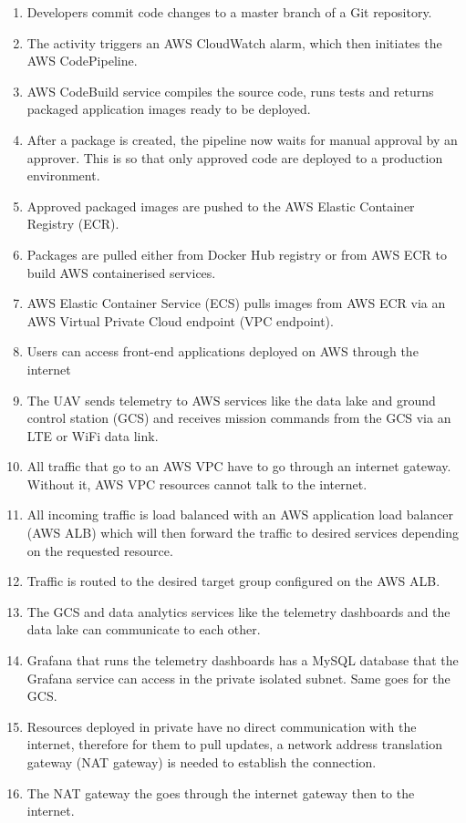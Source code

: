 \begin{enumerate}
    \item Developers commit code changes to a master branch of a Git repository.
    \item The activity triggers an AWS CloudWatch alarm, which then initiates the AWS CodePipeline.
    \item AWS CodeBuild service compiles the source code, runs tests and returns packaged application images ready to be deployed.
    \item After a package is created, the pipeline now waits for manual approval by an approver. This is so that only approved code are deployed to a production environment.
    \item Approved packaged images are pushed to the AWS Elastic Container Registry (ECR).
    \item Packages are pulled either from Docker Hub registry or from AWS ECR to build AWS containerised services.
    \item AWS Elastic Container Service (ECS) pulls images from AWS ECR via an AWS Virtual Private Cloud endpoint (VPC endpoint).
    \item Users can access front-end applications deployed on AWS through the internet
    \item The UAV sends telemetry to AWS services like the data lake and ground control station (GCS) and receives mission commands from the GCS via an LTE or WiFi data link.
    \item All traffic that go to an AWS VPC have to go through an internet gateway. Without it, AWS VPC resources cannot talk to the internet.
    \item All incoming traffic is load balanced with an AWS application load balancer (AWS ALB) which will then forward the traffic to desired services depending on the requested resource.
    \item Traffic is routed to the desired target group configured on the AWS ALB.
    \item The GCS and data analytics services like the telemetry dashboards and the data lake can communicate to each other.
    \item Grafana that runs the telemetry dashboards has a MySQL database that the Grafana service can access in the private isolated subnet. Same goes for the GCS.
    \item Resources deployed in private have no direct communication with the internet, therefore for them to pull updates, a network address translation gateway (NAT gateway) is needed to establish the connection.
    \item The NAT gateway the goes through the internet gateway then to the internet.
\end{enumerate}

